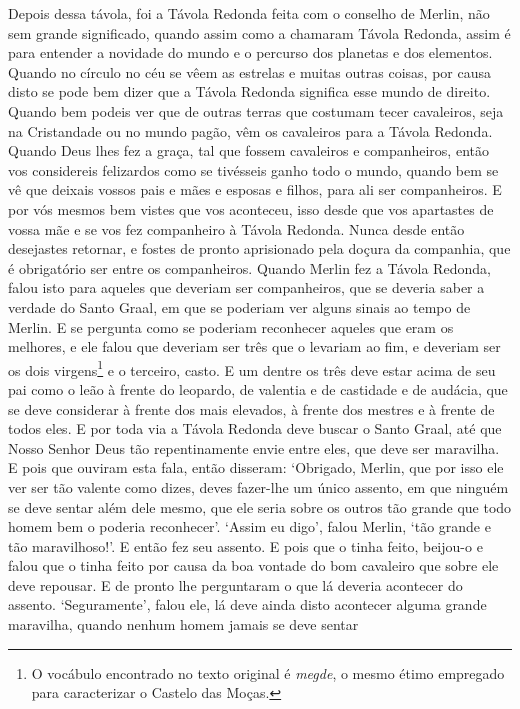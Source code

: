 Depois dessa távola, foi a Távola Redonda feita com o conselho de Merlin, não
sem grande significado, quando assim como a chamaram Távola Redonda, assim é
para entender a novidade do mundo e o percurso dos planetas e dos elementos.
Quando no círculo no céu se vêem as estrelas e muitas outras coisas, por causa
disto se pode bem dizer que a Távola Redonda significa esse mundo de direito.
Quando bem podeis ver que de outras terras que costumam tecer cavaleiros, seja
na Cristandade ou no mundo pagão, vêm os cavaleiros para a Távola Redonda.
Quando Deus lhes fez a graça, tal que fossem cavaleiros e companheiros, então
vos considereis felizardos como se tivésseis ganho todo o mundo, quando bem se
vê que deixais vossos pais e mães e esposas e filhos, para ali ser
companheiros. E por vós mesmos bem vistes que vos aconteceu, isso desde que vos
apartastes de vossa mãe e se vos fez companheiro à Távola Redonda. Nunca desde
então desejastes retornar, e fostes de pronto aprisionado pela doçura da
companhia, que é obrigatório ser entre os companheiros. Quando Merlin fez a
Távola Redonda, falou isto para aqueles que deveriam ser companheiros, que se
deveria saber a verdade do Santo Graal, em que se poderiam ver alguns sinais ao
tempo de Merlin. E se pergunta como se poderiam reconhecer aqueles que eram os
melhores, e ele falou que deveriam ser três que o levariam ao fim, e deveriam
ser os dois virgens\footnote{ O vocábulo encontrado no texto original é
\textit{megde}, o mesmo étimo empregado para caracterizar o Castelo das Moças.}  
e o terceiro, casto. E um dentre os três deve estar acima de seu
pai como o leão à frente do leopardo, de valentia e de castidade e de audácia,
que se deve considerar à frente dos mais elevados, à frente dos mestres e à
frente de todos eles. E por toda via a Távola Redonda deve buscar o Santo
Graal, até que Nosso Senhor Deus tão repentinamente envie entre eles, que deve
ser maravilha. E pois que ouviram esta fala, então disseram: ‘Obrigado, Merlin,
que por isso ele ver ser tão valente como dizes, deves fazer-lhe um único
assento, em que ninguém se deve sentar além dele mesmo,  que ele seria sobre os
outros tão grande que todo homem bem o poderia reconhecer’. ‘Assim eu digo’,
falou Merlin, ‘tão grande e tão maravilhoso!’. E então fez seu assento. E pois
que o tinha feito, beijou-o e falou que o tinha feito por causa da boa vontade
do bom cavaleiro que sobre ele deve repousar. E de pronto lhe perguntaram o que
lá deveria acontecer do assento. ‘Seguramente’, falou ele, lá deve ainda disto
acontecer alguma grande maravilha, quando nenhum homem jamais se deve sentar
